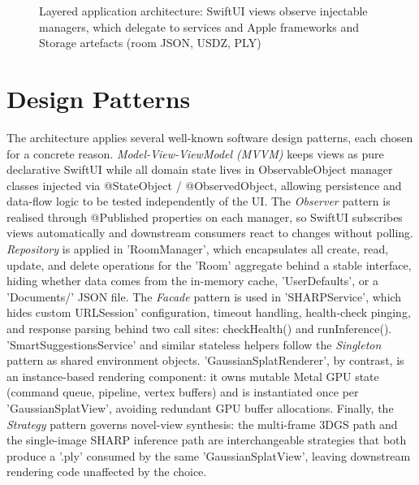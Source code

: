 \begin{figure}[htbp]
\centering

\caption{Layered application architecture: SwiftUI views observe injectable managers, which delegate to services and Apple frameworks and Storage artefacts (room JSON, USDZ, PLY) }
\label{fig:architecture}
\end{figure}

\section{Design Patterns}
\label{sec:design_patterns}

The architecture applies several well-known software design patterns, each chosen for a concrete reason. \textit{Model-View-ViewModel (MVVM)} keeps views as pure declarative SwiftUI while all domain state lives in ObservableObject manager classes injected via @StateObject / @ObservedObject, allowing persistence and data-flow logic to be tested independently of the UI. The \textit{Observer} pattern is realised through @Published properties on each manager, so SwiftUI subscribes views automatically and downstream consumers react to changes without polling. \textit{Repository} is applied in 'RoomManager', which encapsulates all create, read, update, and delete operations for the 'Room' aggregate behind a stable interface, hiding whether data comes from the in-memory cache, 'UserDefaults', or a 'Documents/' JSON file. The \textit{Facade} pattern is used in 'SHARPService', which hides custom URLSession' configuration, timeout handling, health-check pinging, and response parsing behind two call sites: checkHealth() and runInference(). 'SmartSuggestionsService' and similar stateless helpers follow the \textit{Singleton} pattern as shared environment objects. 'GaussianSplatRenderer', by contrast, is an instance-based rendering component: it owns mutable Metal GPU state (command queue, pipeline, vertex buffers) and is instantiated once per 'GaussianSplatView', avoiding redundant GPU buffer allocations. Finally, the \textit{Strategy} pattern governs novel-view synthesis: the multi-frame 3DGS path and the single-image SHARP inference path are interchangeable strategies that both produce a '.ply' consumed by the same 'GaussianSplatView', leaving downstream rendering code unaffected by the choice.



